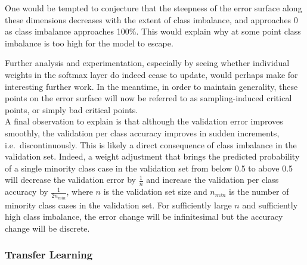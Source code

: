 \documentclass[a4paper,11pt]{article}
\begin{document}
One would be tempted to conjecture that the steepness of the error surface along these dimensions decreases with the extent of class imbalance, and approaches 0 as class imbalance approaches 100\%. This would explain why at some point class imbalance is too high for the model to escape. 

Further analysis and experimentation, especially by seeing whether individual weights in the softmax layer do indeed cease to update, would perhaps make for interesting further work. In the meantime, in order to maintain generality, these points on the error surface will now be referred to as sampling-induced critical points, or simply bad critical points. \\

A final observation to explain is that although the validation error improves smoothly, the validation per class accuracy improves in sudden increments, i.e.\ discontinuously. This is likely a direct consequence of class imbalance in the validation set. Indeed, a weight adjustment that brings the predicted probability of a single minority class case in the validation set from below 0.5 to above 0.5 will decrease the validation error by $\frac{1}{n}$ and increase the validation per class accuracy by $\frac{1}{2n_{min}}$, where $n$ is the validation set size and $n_{min}$ is the number of minority class cases in the validation set. For sufficiently large $n$ and sufficiently high class imbalance, the error change will be infinitesimal but the accuracy change will be discrete.


\subsubsection{Transfer Learning}
\end{document}
